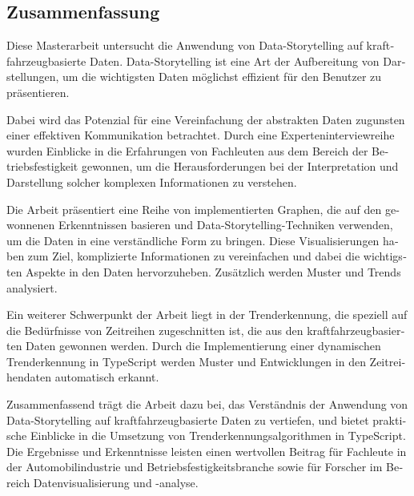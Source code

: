 \begin{otherlanguage}{ngerman}
	\chapter*{Zusammenfassung}
Diese Masterarbeit untersucht die Anwendung von Data-Storytelling auf kraftfahrzeugbasierte Daten. Data-Storytelling ist eine Art der Aufbereitung von Darstellungen, um die wichtigsten Daten möglichst effizient für den Benutzer zu präsentieren.

Dabei wird das Potenzial für eine Vereinfachung der abstrakten Daten zugunsten einer effektiven Kommunikation betrachtet. Durch eine Experteninterviewreihe wurden Einblicke in die Erfahrungen von Fachleuten aus dem Bereich der Betriebsfestigkeit gewonnen, um die Herausforderungen bei der Interpretation und Darstellung solcher komplexen Informationen zu verstehen.

Die Arbeit präsentiert eine Reihe von implementierten Graphen, die auf den gewonnenen Erkenntnissen basieren und Data-Storytelling-Techniken verwenden, um die Daten in eine verständliche Form zu bringen. Diese Visualisierungen haben zum Ziel, komplizierte Informationen zu vereinfachen und dabei die wichtigsten Aspekte in den Daten hervorzuheben. Zusätzlich werden Muster und Trends analysiert.

Ein weiterer Schwerpunkt der Arbeit liegt in der Trenderkennung, die speziell auf die Bedürfnisse von Zeitreihen zugeschnitten ist, die aus den kraftfahrzeugbasierten Daten gewonnen werden. Durch die Implementierung einer dynamischen Trenderkennung in TypeScript werden Muster und Entwicklungen in den Zeitreihendaten automatisch erkannt.

Zusammenfassend trägt die Arbeit dazu bei, das Verständnis der Anwendung von Data-Storytelling auf kraftfahrzeugbasierte Daten zu vertiefen, und bietet praktische Einblicke in die Umsetzung von Trenderkennungsalgorithmen in TypeScript. Die Ergebnisse und Erkenntnisse leisten einen wertvollen Beitrag für Fachleute in der Automobilindustrie und Betriebsfestigkeitsbranche sowie für Forscher im Bereich Datenvisualisierung und -analyse.
\end{otherlanguage}
